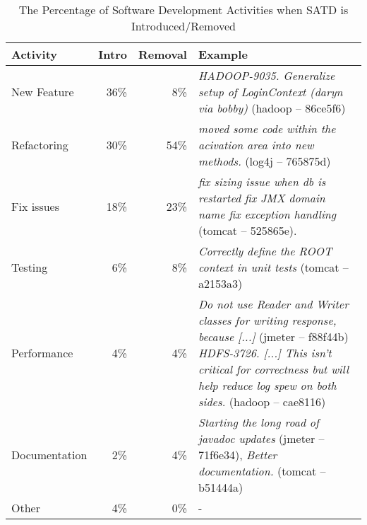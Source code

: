 \begin{table*}[tb]
  \caption{The Percentage of Software Development Activities when SATD is Introduced/Removed }
  \label{tab:percentage_activities} 
  \centering

  \begin{tabular}{l|r|r|p{2.80in}}
  \hline
       \textbf{Activity} & \textbf{Intro} & \textbf{Removal} & \textbf{Example} \\
  \hline
  New Feature &  36\%  &   8\% &  \textit{HADOOP-9035. Generalize setup of LoginContext (daryn via bobby)} (hadoop -- 86ce5f6) \\
  Refactoring &  30\%  &  54\% &  \textit{moved some code within the acivation area into new methods.} (log4j -- 765875d) \\
  Fix issues  &  18\%  &  23\% &  \textit{fix sizing issue when db is restarted fix JMX domain name fix exception handling} (tomcat -- 525865e). \\
  Testing     &   6\%  &   8\% &  \textit{Correctly define the ROOT context in unit tests} (tomcat -- a2153a3) \\
  Performance &   4\%  &   4\% &  \textit{Do not use Reader and Writer classes for writing response, because [...]} (jmeter -- f88f44b) \textit{HDFS-3726. [...] This isn't critical for correctness but will help reduce log spew on both sides.} (hadoop -- cae8116) \\ 
  Documentation & 2\%  &   4\% &  \textit{Starting the long road of javadoc updates} (jmeter -- 71f6e34), \textit{Better documentation.} (tomcat -- b51444a) \\
     
  Other\      &   4\%  &   0\% & -  \\%
  \hline
  \end{tabular}
\end{table*}